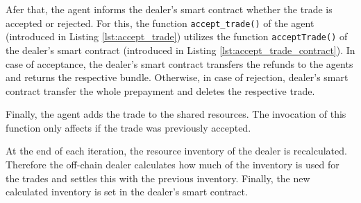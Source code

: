Afer that, the agent informs the dealer's smart contract whether 
the trade is accepted or rejected.
For this, the function \verb|accept_trade()| of the agent
(introduced in Listing \ref{lst:accept_trade})
utilizes the function \verb|acceptTrade()| of the dealer's smart contract
(introduced in Listing \ref{lst:accept_trade_contract}).
In case of acceptance, the dealer's smart contract transfers the refunds 
to the agents and returns the respective bundle. Otherwise, in case of  
rejection, dealer's smart contract transfer the whole prepayment 
and deletes the respective trade.

Finally, the agent adds the trade to the shared resources. The invocation
of this function only affects if the trade was previously accepted. \newline

At the end of each iteration, the resource inventory of the dealer is recalculated.
Therefore the off-chain dealer calculates how much of the inventory is used for
the trades and settles this with the previous inventory.
Finally, the new calculated inventory is set in the dealer's smart contract.

\clearpage